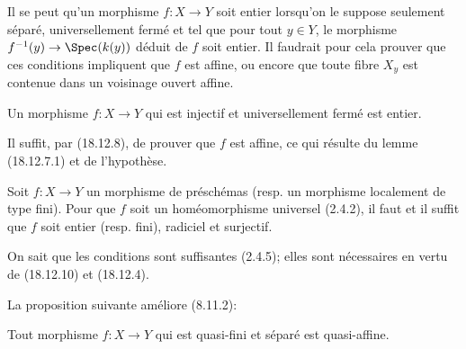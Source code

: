 \begin{remark}[18.12.9]
\label{IV.18.12.9}
Il se peut qu'un morphisme $f:X\to Y$ soit entier lorsqu'on le suppose seulement séparé, universellement fermé et tel que pour tout $y\in Y$, le morphisme $f^{-1}(y)\to\Spec(k(y))$ déduit de $f$ soit entier. Il faudrait pour cela prouver que ces conditions impliquent que $f$ est affine, ou encore que toute fibre $X_y$ est contenue dans un voisinage ouvert affine.
\end{remark}

\begin{corollary}[18.12.10]
\label{IV.18.12.10}
Un morphisme $f:X\to Y$ qui est injectif et universellement fermé est entier.
\end{corollary}

Il suffit, par (18.12.8), de prouver que $f$ est affine, ce qui résulte du lemme (18.12.7.1) et de l'hypothèse.

\begin{corollary}[18.12.11]
\label{IV.18.12.11}
Soit $f:X\to Y$ un morphisme de préschémas (resp. un morphisme localement de type fini). Pour que $f$ soit un homéomorphisme universel (2.4.2), il faut et il suffit que $f$ soit entier (resp. fini), radiciel et surjectif.
\end{corollary}

On sait que les conditions sont suffisantes (2.4.5); elles sont nécessaires en vertu de (18.12.10) et (18.12.4).

La proposition suivante améliore (8.11.2):

\begin{proposition}[18.12.12]
\label{IV.18.12.12}
Tout morphisme $f:X\to Y$ qui est quasi-fini et séparé est quasi-affine.
\end{proposition}

